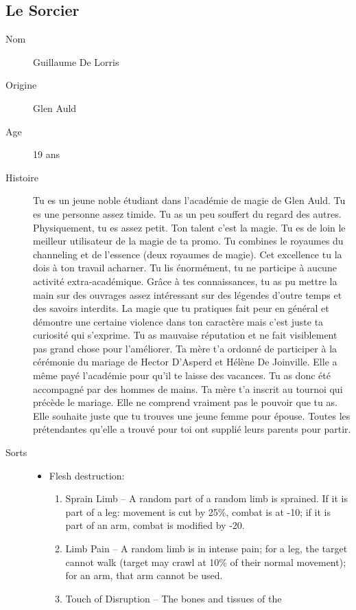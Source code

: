 \documentclass[oneside,12pt]{book}
\begin{document}
\begin{flushleft}
\subsection{Le Sorcier}
\begin{description}
\item[Nom]{Guillaume De Lorris}
\item[Origine]{Glen Auld}
\item[Age]{19 ans}
\item[Histoire]{
\small Tu es un jeune noble étudiant dans l'académie de magie de Glen Auld. Tu es une personne assez timide. Tu as un peu souffert du regard des autres. Physiquement, tu es assez petit. Ton talent c'est la magie. Tu es de loin le meilleur utilisateur de la magie de ta promo. Tu combines le royaumes du channeling et de l'essence (deux royaumes de magie). Cet excellence tu la dois à ton travail acharner. Tu lis énormément, tu ne participe à aucune activité extra-académique. Grâce à tes connaissances, tu as pu mettre la main sur des ouvrages assez intéressant sur des légendes d'outre temps et des savoirs interdits. La magie que tu pratiques fait peur en général et démontre une certaine violence dans ton caractère mais c'est juste ta curiosité qui s'exprime. Tu as mauvaise réputation et ne fait visiblement pas grand chose pour l'améliorer. Ta mère t'a ordonné de participer à la cérémonie du mariage de Hector D'Asperd et Hélène De Joinville. Elle a même payé l'académie pour qu'il te laisse des vacances. Tu as donc été accompagné par des hommes de mains. Ta mère t'a inscrit au tournoi qui précède le mariage. Elle ne comprend vraiment pas le pouvoir que tu as. Elle souhaite juste que tu trouves une jeune femme pour épouse. Toutes les prétendantes qu'elle a trouvé pour toi ont supplié leurs parents pour partir.}
\item[Sorts]{
\begin{itemize}
\item Flesh destruction:
\begin{enumerate}
\scriptsize
\item Sprain Limb – A random part of a random limb is
sprained. If it is part of a leg: movement is cut by 25\%,
combat is at -10; if it is part of an arm, combat is
modified by -20.
\item  Limb Pain – A random limb is in intense pain; for a leg,
the target cannot walk (target may crawl at 10\% of their
normal movement); for an arm, that arm cannot be used.
\item Touch of Disruption – The bones and tissues of the

\end{enumerate}
\end{itemize}}
\end{description}
\end{flushleft}
\end{document}
